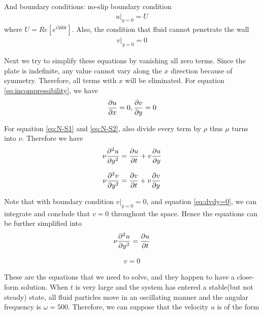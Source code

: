 \documentclass{article}
\begin{document}
And boundary conditions: no-slip boundary condition
\begin{align}
  u|_{y = 0} = U
  \label{eq:boundary1}
\end{align} where $U = Re[e^{i500t}]$.
Also, the condition that fluid cannot penetrate the wall
\begin{align}
  v|_{y = 0} = 0
  \label{eq:boundary2}
\end{align}

Next we try to simplify these equations by vanishing all zero terms. Since the plate is indefinite, any value cannot vary along the $x$ direction because of symmetry. Therefore, all terms with $x$ will be eliminated. For equation \ref{eq:incompressibility}, we have
\begin{align}
\pdv{u}{x}=0, \pdv{v}{y} = 0
  \label{eq:dvdy=0}
\end{align}

For equation \ref{eq:N-S1} and \ref{eq:N-S2}, also divide every term by $\rho$ thus $\mu$ turns into $\nu$. Therefore we have
\begin{align}
\nu \pdv[2]{u}{y} = \pdv{u}{t} + v \pdv{u}{y}
  \label{eq:NV-1-simplified1}
\end{align}

\begin{align}
\nu \pdv[2]{v}{y} = \pdv{v}{t} + v \pdv{v}{y}
  \label{eq:NV-2-simplified1}
\end{align}

Note that with boundary condition $v|_{y = 0} = 0$, and equation \ref{eq:dvdy=0}, we can integrate and conclude that $v = 0$ throughout the space. Hence the equations can be further simplified into
\begin{align}
\nu \pdv[2]{u}{y} = \pdv{u}{t}
  \label{eq:NV-1-simplified2}
\end{align}

\begin{align}
v = 0 \label{eq:v=0}
\end{align}

These are the equations that we need to solve, and they happen to have a close-form solution. When $t$ is very large and the system has entered a stable(but not steady) state, all fluid particles move in an oscillating manner and the angular frequency is $\omega = 500$. Therefore, we can suppose that the velocity $u$ is of the form
\end{document}

